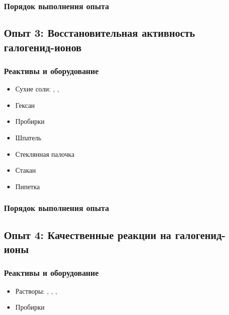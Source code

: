 \documentclass[a4paper, 12pt]{article}
\begin{document}
\subsubsection{Порядок выполнения опыта}

\subsection{Опыт 3: Восстановительная активность галогенид-ионов}

\subsubsection{Реактивы и оборудование}

\begin{itemize}
	\item Сухие соли: , , 
	
	\item Гексан
	
	\item Пробирки
	
	\item Шпатель
	
	\item Стеклянная палочка
	
	\item Стакан
	
	\item Пипетка
\end{itemize}

\subsubsection{Порядок выполнения опыта}

\subsection{Опыт 4: Качественные реакции на галогенид-ионы}

\subsubsection{Реактивы и оборудование}

\begin{itemize}
	\item Растворы: , , , 
	
	\item Пробирки
\end{itemize}
\end{document}
